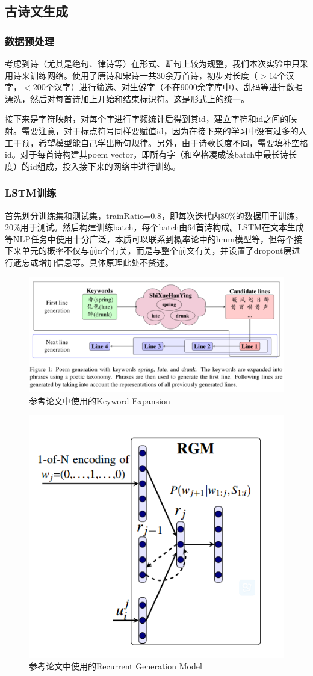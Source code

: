 \documentclass[a4paper, 10pt]{article}
\begin{document}
\subsection{古诗文生成}
\subsubsection*{数据预处理}
考虑到诗（尤其是绝句、律诗等）在形式、断句上较为规整，我们本次实验中只采用诗来训练网络。使用了唐诗和宋诗一共30余万首诗，初步对长度（$>14$个汉字，$<200$个汉字）进行筛选、对生僻字（不在9000余字库中）、乱码等进行数据漂洗，然后对每首诗加上开始和结束标识符。这是形式上的统一。

接下来是字符映射，对每个字进行字频统计后得到其id，建立字符和id之间的映射。需要注意，对于标点符号同样要赋值id，因为在接下来的学习中没有过多的人工干预，希望模型能自己学出断句规律。另外，由于诗歌长度不同，需要填补空格id。对于每首诗构建其poem vector，即所有字（和空格凑成该batch中最长诗长度）的id组成，投入接下来的网络中进行训练。

\subsubsection*{LSTM训练}
首先划分训练集和测试集，trainRatio=0.8，即每次迭代内$80\%$的数据用于训练，$20\%$用于测试。然后构建训练batch，每个batch由64首诗构成。LSTM在文本生成等NLP任务中使用十分广泛，本质可以联系到概率论中的hmm模型等，但每个接下来单元的概率不仅与前n个有关，而是与整个前文有关，并设置了dropout层进行遗忘或增加信息等。具体原理此处不赘述。

\begin{figure}[H]
\centering
\includegraphics[width=0.8\linewidth]{imgs/4.png}
\caption{参考论文中使用的Keyword Expansion}
\end{figure}
\begin{figure}[H]
\centering
\includegraphics[width=0.4\linewidth]{imgs/5.png}
\caption{参考论文中使用的Recurrent Generation Model}
\end{figure}
\end{document}
